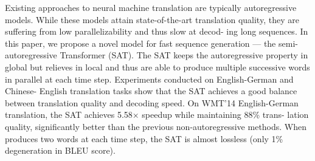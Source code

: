 Existing approaches to neural machine translation are typically autoregressive models. While these models attain state-of-the-art translation quality, they are suffering from low parallelizability and thus slow at decod- ing long sequences. In this paper, we propose a novel model for fast sequence generation — the semi-autoregressive Transformer (SAT). The SAT keeps the autoregressive property in global but relieves in local and thus are able to produce multiple successive words in parallel at each time step. Experiments conducted on English-German and Chinese- English translation tasks show that the SAT achieves a good balance between translation quality and decoding speed. On WMT'14 English-German translation, the SAT achieves 5.58× speedup while maintaining 88\% trans- lation quality, significantly better than the previous non-autoregressive methods. When produces two words at each time step, the SAT is almost lossless (only 1\% degeneration in BLEU score).
